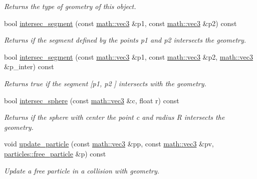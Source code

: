 \begin{DoxyCompactItemize}
\begin{DoxyCompactList}\small\item\em Returns the type of geometry of this object. \end{DoxyCompactList}\item 
bool \hyperlink{classphysim_1_1geometric_1_1sphere_ae9e58ed95da106650ca29f210d75223b}{intersec\+\_\+segment} (const \hyperlink{structphysim_1_1math_1_1vec3}{math\+::vec3} \&p1, const \hyperlink{structphysim_1_1math_1_1vec3}{math\+::vec3} \&p2) const
\begin{DoxyCompactList}\small\item\em Returns if the segment defined by the points {\itshape p1} and {\itshape p2} intersects the geometry. \end{DoxyCompactList}\item 
bool \hyperlink{classphysim_1_1geometric_1_1sphere_ac89b9985569693cb7f6ba6cb3d0fe9f8}{intersec\+\_\+segment} (const \hyperlink{structphysim_1_1math_1_1vec3}{math\+::vec3} \&p1, const \hyperlink{structphysim_1_1math_1_1vec3}{math\+::vec3} \&p2, \hyperlink{structphysim_1_1math_1_1vec3}{math\+::vec3} \&p\+\_\+inter) const
\begin{DoxyCompactList}\small\item\em Returns true if the segment \mbox{[}{\itshape p1}, {\itshape p2} \mbox{]} intersects with the geometry. \end{DoxyCompactList}\item 
bool \hyperlink{classphysim_1_1geometric_1_1sphere_ad0f0fb96457cef20bb6626cad129b90b}{intersec\+\_\+sphere} (const \hyperlink{structphysim_1_1math_1_1vec3}{math\+::vec3} \&c, float r) const
\begin{DoxyCompactList}\small\item\em Returns if the sphere with center the point {\itshape c} and radius {\itshape R} intersects the geometry. \end{DoxyCompactList}\item 
void \hyperlink{classphysim_1_1geometric_1_1sphere_a22318ec85e433ed92a0a9f90aed97b79}{update\+\_\+particle} (const \hyperlink{structphysim_1_1math_1_1vec3}{math\+::vec3} \&pp, const \hyperlink{structphysim_1_1math_1_1vec3}{math\+::vec3} \&pv, \hyperlink{classphysim_1_1particles_1_1free__particle}{particles\+::free\+\_\+particle} \&p) const
\begin{DoxyCompactList}\small\item\em Update a free particle in a collision with geometry. \end{DoxyCompactList}\item 

\end{DoxyCompactItemize}
